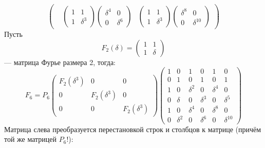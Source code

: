 \[\begin{pmatrix}
         &
        \begin{pmatrix}
            1 & 1        \\
            1 & \delta^3
        \end{pmatrix}
        \begin{pmatrix}
            \delta^4 & 0        \\
            0        & \delta^6
        \end{pmatrix}
         &
        \begin{pmatrix}
            1 & 1        \\
            1 & \delta^3
        \end{pmatrix}
        \begin{pmatrix}
            \delta^8 & 0           \\
            0        & \delta^{10}
        \end{pmatrix}
    \end{pmatrix}
\]
Пусть
\[
    F_2(\delta)
    = \begin{pmatrix}
        1 & 1      \\
        1 & \delta
    \end{pmatrix}
\]
--- матрица Фурье размера 2, тогда:
\[
    F_6
    = P_6
    \begin{pmatrix}
        F_2(\delta^3) & 0             & 0             \\
        0             & F_2(\delta^3) & 0             \\
        0             & 0             & F_2(\delta^3)
    \end{pmatrix}
    \begin{pmatrix}
        1 & 0        & 1        & 0        & 1        & 0           \\
        0 & 1        & 0        & 1        & 0        & 1           \\
        1 & 0        & \delta^2 & 0        & \delta^4 & 0           \\
        0 & \delta   & 0        & \delta^3 & 0        & \delta^5    \\
        1 & 0        & \delta^4 & 0        & \delta^8 & 0           \\
        0 & \delta^2 & 0        & \delta^6 & 0        & \delta^{10}
    \end{pmatrix}
\]
Матрица слева преобразуется перестановкой строк и столбцов к матрице (причём той же матрицей $P_6$!):
